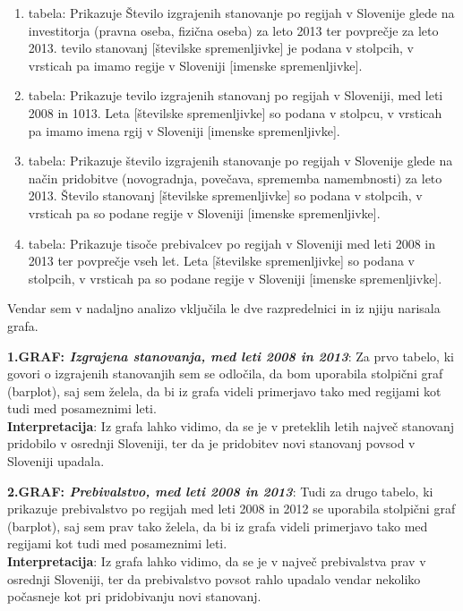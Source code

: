 \documentclass[11pt,a4paper]{article}
\begin{document}
\begin{enumerate}
\item{tabela: Prikazuje Število izgrajenih stanovanje po regijah v Slovenije glede na investitorja (pravna oseba, fizična oseba) za leto 2013 ter povprečje za leto 2013. tevilo stanovanj [številske spremenljivke] je podana v stolpcih, v vrsticah pa imamo regije v Sloveniji [imenske spremenljivke].}
\item{tabela: Prikazuje tevilo izgrajenih stanovanj po regijah v Sloveniji, med leti 2008 in 1013. Leta [številske spremenljivke] so podana v stolpcu, v vrsticah pa imamo imena rgij v Sloveniji [imenske spremenljivke].}
\item{tabela: Prikazuje število izgrajenih stanovanje po regijah v Slovenije glede na način pridobitve (novogradnja, povečava, sprememba namembnosti) za leto 2013. Število stanovanj [številske spremenljivke] so podana v stolpcih, v vrsticah pa so podane regije v Sloveniji [imenske spremenljivke].}
\item{tabela: Prikazuje tisoče prebivalcev po regijah v Sloveniji med leti 2008 in 2013 ter povprečje vseh let. Leta [številske spremenljivke] so podana v stolpcih, v vrsticah pa so podane regije v Sloveniji [imenske spremenljivke].}
\end{enumerate}

Vendar sem v nadaljno analizo vključila le dve razpredelnici in iz njiju narisala grafa.

\newpage
\textbf{1.GRAF: \emph{Izgrajena stanovanja, med leti 2008 in 2013}}: Za prvo tabelo, ki govori o izgrajenih stanovanjih sem se odločila, da bom uporabila stolpični graf (barplot), saj sem želela, da bi iz grafa videli primerjavo tako med regijami kot tudi med posameznimi leti.\\
\textbf{Interpretacija}: Iz grafa lahko vidimo, da se je v preteklih letih največ stanovanj pridobilo v osrednji Sloveniji, ter da je pridobitev novi stanovanj povsod v Sloveniji upadala.

\makebox[\textwidth][c]{

}

\newpage
\textbf{2.GRAF: \emph{Prebivalstvo, med leti 2008 in 2013}}: Tudi za drugo tabelo, ki prikazuje prebivalstvo po regijah med leti 2008 in 2012 se uporabila stolpični graf (barplot), saj sem prav tako želela, da bi iz grafa videli primerjavo tako med regijami kot tudi med posameznimi leti.\\
\textbf{Interpretacija}: Iz grafa lahko vidimo, da se je v največ prebivalstva prav v osrednji Sloveniji, ter da prebivalstvo povsot rahlo upadalo vendar nekoliko počasneje kot pri pridobivanju novi stanovanj.
\end{document}

